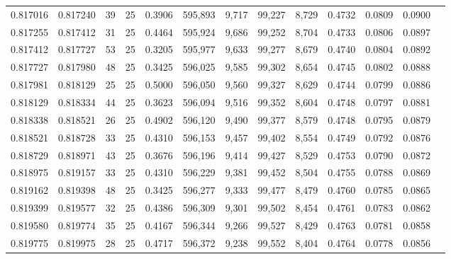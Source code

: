 \begin{tabular}{rrrrrrrrrrrrr}
0.817016 & 0.817240 &    39 &  25 &                                     0.3906 & 595,893 &   9,717 &  99,227 &   8,729 & 0.4732 & 0.0809 & 0.0900 \\
0.817255 & 0.817412 &    31 &  25 &                                     0.4464 & 595,924 &   9,686 &  99,252 &   8,704 & 0.4733 & 0.0806 & 0.0897 \\
0.817412 & 0.817727 &    53 &  25 &                                     0.3205 & 595,977 &   9,633 &  99,277 &   8,679 & 0.4740 & 0.0804 & 0.0892 \\
0.817727 & 0.817980 &    48 &  25 &                                     0.3425 & 596,025 &   9,585 &  99,302 &   8,654 & 0.4745 & 0.0802 & 0.0888 \\
0.817981 & 0.818129 &    25 &  25 &                                     0.5000 & 596,050 &   9,560 &  99,327 &   8,629 & 0.4744 & 0.0799 & 0.0886 \\
0.818129 & 0.818334 &    44 &  25 &                                     0.3623 & 596,094 &   9,516 &  99,352 &   8,604 & 0.4748 & 0.0797 & 0.0881 \\
0.818338 & 0.818521 &    26 &  25 &                                     0.4902 & 596,120 &   9,490 &  99,377 &   8,579 & 0.4748 & 0.0795 & 0.0879 \\
0.818521 & 0.818728 &    33 &  25 &                                     0.4310 & 596,153 &   9,457 &  99,402 &   8,554 & 0.4749 & 0.0792 & 0.0876 \\
0.818729 & 0.818971 &    43 &  25 &                                     0.3676 & 596,196 &   9,414 &  99,427 &   8,529 & 0.4753 & 0.0790 & 0.0872 \\
0.818975 & 0.819157 &    33 &  25 &                                     0.4310 & 596,229 &   9,381 &  99,452 &   8,504 & 0.4755 & 0.0788 & 0.0869 \\
0.819162 & 0.819398 &    48 &  25 &                                     0.3425 & 596,277 &   9,333 &  99,477 &   8,479 & 0.4760 & 0.0785 & 0.0865 \\
0.819399 & 0.819577 &    32 &  25 &                                     0.4386 & 596,309 &   9,301 &  99,502 &   8,454 & 0.4761 & 0.0783 & 0.0862 \\
0.819580 & 0.819774 &    35 &  25 &                                     0.4167 & 596,344 &   9,266 &  99,527 &   8,429 & 0.4763 & 0.0781 & 0.0858 \\
0.819775 & 0.819975 &    28 &  25 &                                     0.4717 & 596,372 &   9,238 &  99,552 &   8,404 & 0.4764 & 0.0778 & 0.0856 \\

\end{tabular}
